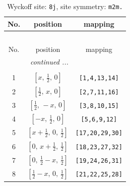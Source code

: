 \documentclass[fleqn,8pt]{jsarticle}
\begin{document}
\begin{longtable}{ccc}
\caption{Wyckoff site: {\tt 8j}, site symmetry: {\tt m2m.}}
 \\
 \hline \hline
No. & position & mapping \\ \hline \endfirsthead

\multicolumn{2}{l}{\tablename\ \thetable{}} \\
 \hline \hline
No. & position & mapping \\ \hline \endhead

 \hline \hline
\multicolumn{2}{r}{\footnotesize\it continued ...} \\ \endfoot

 \hline \hline
\multicolumn{2}{r}{} \\ \endlastfoot

1 & $\left[ x,\, \frac{1}{2},\, 0 \right]$ & {\tt [1,4,13,14]} \\ \hline
2 & $\left[ \frac{1}{2},\, x,\, 0 \right]$ & {\tt [2,7,11,16]} \\ \hline
3 & $\left[ \frac{1}{2},\, - x,\, 0 \right]$ & {\tt [3,8,10,15]} \\ \hline
4 & $\left[ - x,\, \frac{1}{2},\, 0 \right]$ & {\tt [5,6,9,12]} \\ \hline
5 & $\left[ x + \frac{1}{2},\, 0,\, \frac{1}{2} \right]$ & {\tt [17,20,29,30]} \\ \hline
6 & $\left[ 0,\, x + \frac{1}{2},\, \frac{1}{2} \right]$ & {\tt [18,23,27,32]} \\ \hline
7 & $\left[ 0,\, \frac{1}{2} - x,\, \frac{1}{2} \right]$ & {\tt [19,24,26,31]} \\ \hline
8 & $\left[ \frac{1}{2} - x,\, 0,\, \frac{1}{2} \right]$ & {\tt [21,22,25,28]} \\
\end{longtable}
\renewcommand{\arraystretch}{1.2}
\end{document}
